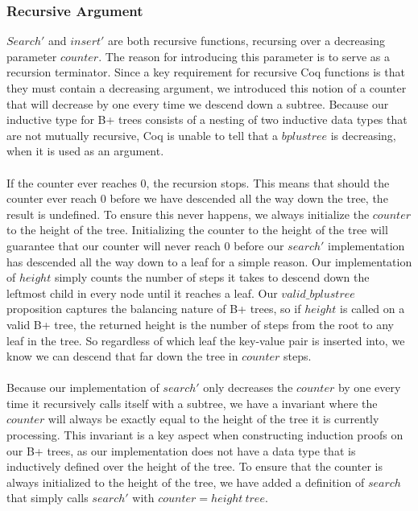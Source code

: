 \subsubsection{Recursive Argument}
$Search'$ and $insert'$ are both recursive functions, recursing over a decreasing parameter $counter$. The reason for introducing this parameter is to serve as a recursion terminator. Since a key requirement for recursive Coq functions is that they must contain a decreasing argument, we introduced this notion of a counter that will decrease by one every time we descend down a subtree. Because our inductive type for B+ trees consists of a nesting of two inductive data types that are not mutually recursive, Coq is unable to tell that a $bplustree$ is decreasing, when it is used as an argument. 
\paragraph{}
If the counter ever reaches $0$, the recursion stops. This means that should the counter ever reach $0$ before we have descended all the way down the tree, the result is undefined. To ensure this never happens, we always initialize the $counter$ to the height of the tree. Initializing the counter to the height of the tree will guarantee that our counter will never reach $0$ before our $search'$ implementation has descended all the way down to a leaf for a simple reason. Our implementation of $height$ simply counts the number of steps it takes to descend down the leftmost child in every node until it reaches a leaf. Our $valid\_bplustree$ proposition captures the balancing nature of B+ trees, so if $height$ is called on a valid B+ tree, the returned height is the number of steps from the root to any leaf in the tree. So regardless of which leaf the key-value pair is inserted into, we know we can descend that far down the tree in $counter$ steps. 
\paragraph{}
Because our implementation of $search'$ only decreases the $counter$ by one every time it recursively calls itself with a subtree, we have a invariant where the $counter$ will always be exactly equal to the height of the tree it is currently processing. This invariant is a key aspect when constructing induction proofs on our B+ trees, as our implementation does not have a data type that is inductively defined over the height of the tree. To ensure that the counter is always initialized to the height of the tree, we have added a definition of $search$ that simply calls $search'$ with $counter = height~tree$.

